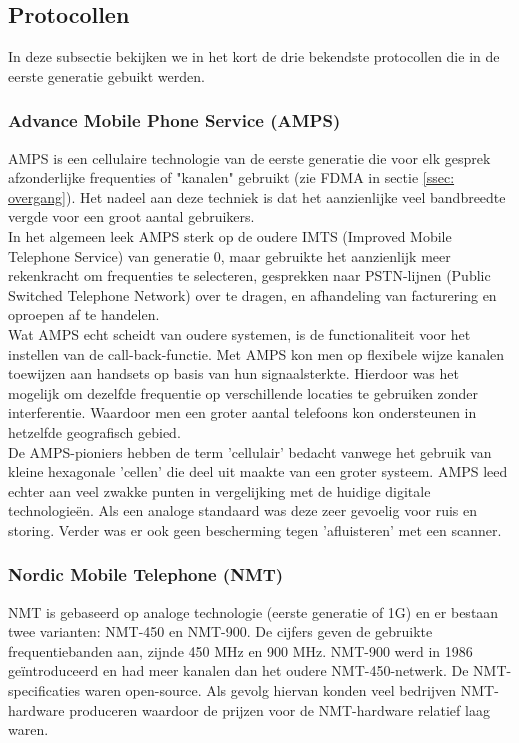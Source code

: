 \documentclass{article}
\begin{document}
\subsection{Protocollen}

In deze subsectie bekijken we in het kort de drie bekendste protocollen die in de eerste generatie gebuikt werden. \cite{technieken}

\subsubsection{Advance Mobile Phone Service (AMPS)}
AMPS is een cellulaire technologie van de eerste generatie die voor elk gesprek afzonderlijke frequenties of "kanalen" gebruikt (zie FDMA in sectie \ref{ssec: overgang}). Het nadeel aan deze techniek is dat het aanzienlijke veel bandbreedte vergde voor een groot aantal gebruikers. \\

\noindent In het algemeen leek AMPS sterk op de oudere IMTS (Improved Mobile Telephone Service) van generatie 0, maar gebruikte het aanzienlijk meer rekenkracht om frequenties te selecteren, gesprekken naar PSTN-lijnen (Public Switched Telephone Network) over te dragen, en afhandeling van facturering en oproepen af te handelen. \\

\noindent Wat AMPS echt scheidt van oudere systemen, is de functionaliteit voor het instellen van de call-back-functie. Met AMPS kon men op flexibele wijze kanalen toewijzen aan handsets op basis van hun signaalsterkte. Hierdoor was het mogelijk om dezelfde frequentie op verschillende locaties te gebruiken zonder interferentie. Waardoor men een groter aantal telefoons kon ondersteunen in hetzelfde geografisch gebied. \\

\noindent De AMPS-pioniers hebben de term 'cellulair' bedacht vanwege het gebruik van kleine hexagonale 'cellen' die deel uit maakte van een groter systeem. AMPS leed echter aan veel zwakke punten in vergelijking met de huidige digitale technologieën. Als een analoge standaard was deze zeer gevoelig voor ruis en storing. Verder was er ook geen bescherming tegen 'afluisteren' met een scanner. \cite{amps}

\subsubsection{Nordic Mobile Telephone (NMT)}
NMT is gebaseerd op analoge technologie (eerste generatie of 1G) en er bestaan twee varianten: NMT-450 en NMT-900. De cijfers geven de gebruikte frequentiebanden aan, zijnde 450 MHz en 900 MHz. NMT-900 werd in 1986 geïntroduceerd en had meer kanalen dan het oudere NMT-450-netwerk. De NMT-specificaties waren open-source. Als gevolg hiervan konden veel bedrijven NMT-hardware produceren waardoor de prijzen voor de NMT-hardware relatief laag waren.\\
\end{document}
